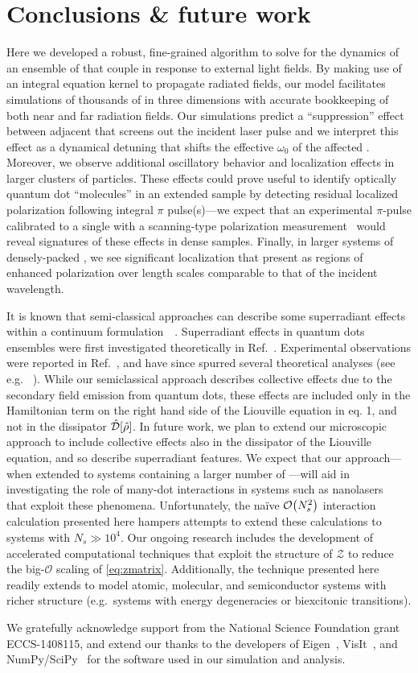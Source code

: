 \section{\label{section:conclusion}Conclusions \& future work}
Here we developed a robust, fine-grained algorithm to solve for the dynamics of an ensemble of \qds{} that couple in response to external light fields.
By making use of an integral equation kernel to propagate radiated fields, our model facilitates simulations of thousands of \qds{} in three dimensions with accurate bookkeeping of both near and far radiation fields.
Our simulations predict a ``suppression'' effect between adjacent \qds{} that screens out the incident laser pulse and we interpret this effect as a dynamical detuning that shifts the effective $\omega_0$ of the affected \qds{}.
Moreover, we observe additional oscillatory behavior and localization effects in larger clusters of particles.
These effects could prove useful to identify optically quantum dot ``molecules'' in an extended sample by detecting residual localized polarization following integral $\pi$ pulse(s)---we expect that an experimental $\pi$-pulse calibrated to a single \qd{} with a scanning-type polarization measurement~\cite{Asakura2013} would reveal signatures of these effects in dense samples.
Finally, in larger systems of densely-packed \qds{}, we see significant localization that present as regions of enhanced polarization over length scales comparable to that of the incident wavelength.

It is known that semi-classical approaches can describe some superradiant effects within a continuum formulation~~\cite{Gross1982,PhysRevA.4.302,PhysRevA.4.854}. Superradiant effects in quantum dots ensembles were first investigated theoretically in Ref.~\cite{Temnov2005}. Experimental observations were reported in Ref.~\cite{Scheibner2007}, and have since spurred several theoretical analyses (see e.g. ~\cite{Temnov2009,Chen2008}). While our semiclassical approach describes collective effects due to the secondary field emission from quantum dots, these effects are included only in the Hamiltonian term on the right hand side of the Liouville equation in eq. 1, and not in the dissipator  $\hat{\mathcal{D}}\qty[\hat{\rho}]$.  In future work, we plan to extend our microscopic approach to include collective effects also in the dissipator of the Liouville equation, and so describe superradiant features.  We expect that our approach---when extended to systems containing a larger number of \qds{}---will aid in investigating the role of many-dot interactions in systems such as nanolasers~\cite{jahnke2016giant} that exploit these phenomena.
Unfortunately, the na\"ive $\mathcal{O}\qty(N_s^2)$ interaction calculation presented here hampers attempts to extend these calculations to systems with $N_s \gg 10^4$.
Our ongoing research includes the development of accelerated computational techniques that exploit the structure of $\mathcal{Z}$ to reduce the big-$\mathcal{O}$ scaling of \cref{eq:zmatrix}.
Additionally, the technique presented here readily extends to model atomic, molecular, and semiconductor systems with richer structure (e.g.\ systems with energy degeneracies or biexcitonic transitions).

\acknowledgments
We gratefully acknowledge support from the National Science Foundation grant ECCS-1408115, and extend our thanks to the developers of Eigen~\cite{Eigen}, VisIt~\cite{VisIt}, and NumPy/SciPy~\cite{NumPy,SciPy} for the software used in our simulation and analysis.
\vspace{.5 cm}



